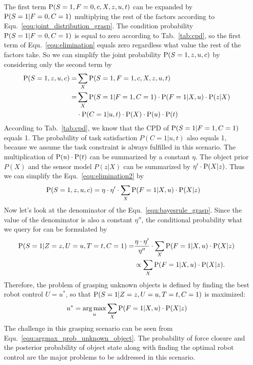 The first term $\operatorname*{\text{P}} (S=1, F = 0, c ,X, z,u,t)$ can be expanded by $ \operatorname*{\text{P}} (S=1|F=0,C=1) $ multiplying the rest of the factors according to Equ.~\ref{equ:joint_distribution_grasp}. The condition probability $\operatorname*{\text{P}} (S=1|F=0,C=1)$ is equal to zero according to Tab.~\ref{tab:cpd}, so the first term of Equ.~\ref{equ:elimination} equals zero regardless what value the rest of the factors take. So we can simplify the joint probability $\operatorname*{\text{P}}(S = 1,z,u,c)$ by considering only the second term by
\begin{equation}
\begin{split}
  \operatorname*{\text{P}}(S = 1,z,u,c) =& \sum_{X} \operatorname*{\text{P}} (S=1,F=1,c,X,z,u,t) \\
				    =&  \sum_{X} \operatorname*{\text{P}} (S=1|F=1,C=1) \cdot \operatorname*{\text{P}}(F = 1|X,u)\cdot\operatorname*{\text{P}}(z|X) \\
				    &\cdot \operatorname*{\text{P}}(C=1|u,t) \cdot \operatorname*{\text{P}}(X) \cdot \operatorname*{\text{P}}(u) \cdot \operatorname*{\text{P}}(t)
\end{split}
\label{equ:elimination2}
\end{equation}
According to Tab.~\ref{tab:cpd}, we know that the CPD of $\operatorname*{\text{P}} (S=1|F=1,C=1)$ equals 1. The probability of task satisfaction $P(C=1| u,t )$ also equals 1, because we assume the task constraint is always fulfilled in this scenario. The multiplication of $\operatorname*{\text{P}}(u) \cdot \operatorname*{\text{P}}(t)$ can be summarized by a constant $\eta$. The object prior $P(X)$ and the sensor model $P(z|X)$ can be summarized by $\eta' \cdot \operatorname*{\text{P}}(X|z)$. Thus we can simplify the Equ.~\ref{equ:elimination2} by 
\begin{equation}
\begin{split}
  \operatorname*{\text{P}}(S = 1,z,u,c) & = \eta \cdot \eta' \cdot \sum_{X} \operatorname*{\text{P}}(F = 1|X,u)\cdot \operatorname*{\text{P}}(X|z) 
\end{split}
\end{equation}
Now let's look at the denominator of the Equ.~\ref{equ:bayesrule_grasp}. Since the value of the denominator is also a constant $\eta''$, the conditional probability what we query for can be formulated by
\begin{equation}
\begin{split}
\operatorname*{\text{P}}(S = 1|Z=z,U=u,T=t,C=1) =&  \frac{\eta \cdot \eta'}{\eta''}  \cdot \sum_{X} \operatorname*{\text{P}}(F = 1|X,u)\cdot \operatorname*{\text{P}}(X|z) \\
						  & \propto  \sum_{X} \operatorname*{\text{P}}(F = 1|X,u)\cdot \operatorname*{\text{P}}(X|z).
\end{split}
\end{equation}
Therefore, the problem of grasping unknown objects is defined by finding the best robot control $U = u^*$, so that $\operatorname*{\text{P}}(S = 1|Z=z,U=u,T=t,C=1)$ is maximized: 
 \begin{equation}
 u^* = \operatorname*{arg\,max}_{u} \sum_{X} \operatorname*{\text{P}}(F = 1|X,u)\cdot \operatorname*{\text{P}}(X|z) 
\label{equ:argmax_prob_unknown_object}
\end{equation}
The challenge in this grasping scenario can be seen from Equ.~\ref{equ:argmax_prob_unknown_object}.  The probability of force closure and the posterior probability of object state along with finding the optimal robot control are the major problems to be addressed in this scenario. 


